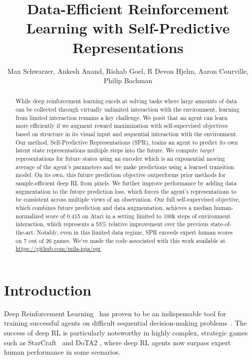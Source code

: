 \title{Data-Efficient Reinforcement Learning with Self-Predictive Representations}

\author{Max Schwarzer, Ankesh Anand, Rishab Goel, R Devon Hjelm, Aaron Courville, Philip Bachman}

\begin{abstract}
While deep reinforcement learning excels at solving tasks where large amounts of data can be collected through virtually unlimited interaction with the environment, learning from limited interaction remains a key challenge. We posit that an agent can learn more efficiently if we augment reward maximization with self-supervised objectives based on structure in its visual input and sequential interaction with the environment. Our method, Self-Predictive Representations (SPR), trains an agent to predict its own latent state representations multiple steps into the future. We compute \emph{target} representations for future states using an encoder which is an exponential moving average of the agent's parameters and we make predictions using a learned transition model. On its own, this future prediction objective outperforms prior methods for sample-efficient deep RL from pixels. We further improve performance by adding data augmentation to the future prediction loss, which forces the agent's representations to be consistent across multiple views of an observation. Our full self-supervised objective, which combines future prediction and data augmentation, achieves a median human-normalized score of 0.415 on Atari in a setting limited to 100k steps of environment interaction, which represents a 55\% relative improvement over the previous state-of-the-art. Notably, even in this limited data regime, SPR exceeds expert human scores on 7 out of 26 games. We've made the code associated with this work available at \url{https://github.com/mila-iqia/spr}.
\end{abstract}

\section{Introduction}
Deep Reinforcement Learning~\citep[deep RL,][]{franccois2018introduction} has proven to be an indispensable tool for training successful agents on difficult sequential decision-making problems~\citep{ALE, dm_control}. The success of deep RL is particularly noteworthy in highly complex, strategic games such as StarCraft~\citep{vinyals2019grandmaster} and DoTA2 \citep{dota2}, where deep RL agents now surpass expert human performance in some scenarios.


